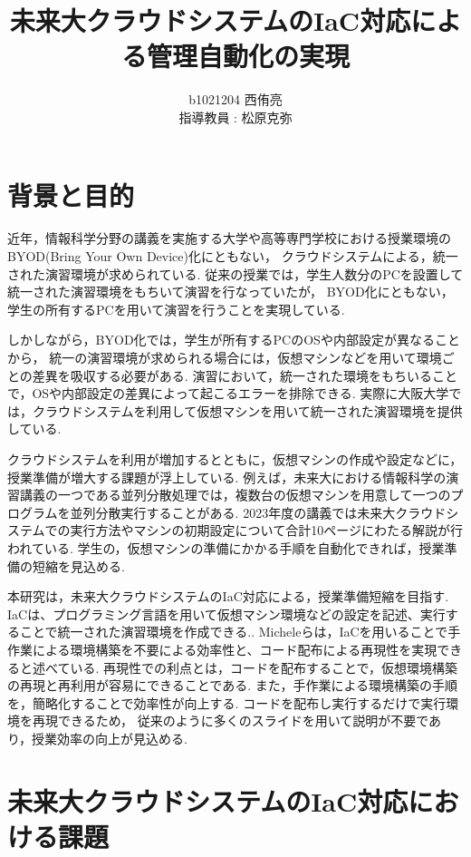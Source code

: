 \documentclass[11pt]{ujarticle}\sloppy
\author{%
b1021204 西侑亮\\指導教員 : 松原克弥
}
\title{未来大クラウドシステムのIaC対応による管理自動化の実現}
\begin{document}
\maketitle


\section{背景と目的}
\label{sec:intro}
近年，情報科学分野の講義を実施する大学や高等専門学校における授業環境のBYOD(Bring Your Own Device)化\cite{byod}にともない，
クラウドシステムによる，統一された演習環境が求められている.
従来の授業では，学生人数分のPCを設置して統一された演習環境をもちいて演習を行なっていたが，
BYOD化にともない，学生の所有するPCを用いて演習を行うことを実現している.


しかしながら，BYOD化では，学生が所有するPCのOSや内部設定が異なることから，
統一の演習環境が求められる場合には，仮想マシンなどを用いて環境ごとの差異を吸収する必要がある.
演習において，統一された環境をもちいることで，OSや内部設定の差異によって起こるエラーを排除できる.
実際に大阪大学では，クラウドシステムを利用して仮想マシンを用いて統一された演習環境を提供している\cite{oosakadai}.


クラウドシステムを利用が増加するとともに，仮想マシンの作成や設定などに，
授業準備が増大する課題が浮上している.
例えば，未来大における情報科学の演習講義の一つである並列分散処理では，複数台の仮想マシンを用意して一つのプログラムを並列分散実行することがある.
2023年度の講義では未来大クラウドシステムでの実行方法やマシンの初期設定について合計10ページにわたる解説が行われている.
学生の，仮想マシンの準備にかかる手順を自動化できれば，授業準備の短縮を見込める.


本研究は，未来大クラウドシステムのIaC対応による，授業準備短縮を目指す.
IaCは、プログラミング言語を用いて仮想マシン環境などの設定を記述、実行することで統一された演習環境を作成できる.\cite{O'Reilly Media}.
Micheleら\cite{InformationSystem}は，IaCを用いることで手作業による環境構築を不要による効率性と、コード配布による再現性を実現できると述べている.
再現性での利点とは，コードを配布することで，仮想環境構築の再現と再利用が容易にできることである.
また，手作業による環境構築の手順を，簡略化することで効率性が向上する.
コードを配布し実行するだけで実行環境を再現できるため，
従来のように多くのスライドを用いて説明が不要であり，授業効率の向上が見込める.


\section{未来大クラウドシステムのIaC対応における課題}
\end{document}
